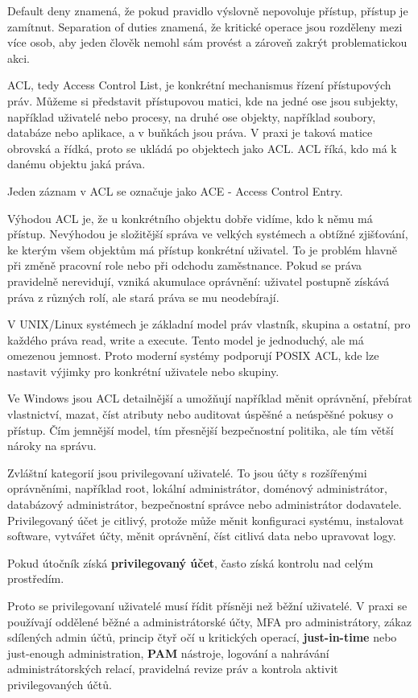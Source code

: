 Default deny znamená, že pokud pravidlo výslovně nepovoluje přístup, přístup je zamítnut. Separation of duties znamená, že kritické operace jsou rozděleny mezi více osob, aby jeden člověk nemohl sám provést a zároveň zakrýt problematickou akci.

ACL, tedy Access Control List, je konkrétní mechanismus řízení přístupových práv. Můžeme si představit přístupovou matici, kde na jedné ose jsou subjekty, například uživatelé nebo procesy, na druhé ose objekty, například soubory, databáze nebo aplikace, a v buňkách jsou práva. V praxi je taková matice obrovská a řídká, proto se ukládá po objektech jako ACL. ACL říká, kdo má k danému objektu jaká práva.

Jeden záznam v ACL se označuje jako ACE - Access Control Entry.

Výhodou ACL je, že u konkrétního objektu dobře vidíme, kdo k němu má přístup. Nevýhodou je složitější správa ve velkých systémech a obtížné zjišťování, ke kterým všem objektům má přístup konkrétní uživatel. To je problém hlavně při změně pracovní role nebo při odchodu zaměstnance. Pokud se práva pravidelně nerevidují, vzniká akumulace oprávnění: uživatel postupně získává práva z různých rolí, ale stará práva se mu neodebírají.

V UNIX/Linux systémech je základní model práv vlastník, skupina a ostatní, pro každého práva read, write a execute. Tento model je jednoduchý, ale má omezenou jemnost. Proto moderní systémy podporují POSIX ACL, kde lze nastavit výjimky pro konkrétní uživatele nebo skupiny.

Ve Windows jsou ACL detailnější a umožňují například měnit oprávnění, přebírat vlastnictví, mazat, číst atributy nebo auditovat úspěšné a neúspěšné pokusy o přístup. Čím jemnější model, tím přesnější bezpečnostní politika, ale tím větší nároky na správu.

Zvláštní kategorií jsou privilegovaní uživatelé. To jsou účty s rozšířenými oprávněními, například root, lokální administrátor, doménový administrátor, databázový administrátor, bezpečnostní správce nebo administrátor dodavatele. Privilegovaný účet je citlivý, protože může měnit konfiguraci systému, instalovat software, vytvářet účty, měnit oprávnění, číst citlivá data nebo upravovat logy.

Pokud útočník získá \textbf{privilegovaný účet}, často získá kontrolu nad celým prostředím.

Proto se privilegovaní uživatelé musí řídit přísněji než běžní uživatelé. V praxi se používají oddělené běžné a administrátorské účty, MFA pro administrátory, zákaz sdílených admin účtů, princip čtyř očí u kritických operací, \textbf{just-in-time} nebo just-enough administration, \textbf{PAM} nástroje, logování a nahrávání administrátorských relací, pravidelná revize práv a kontrola aktivit privilegovaných účtů.

